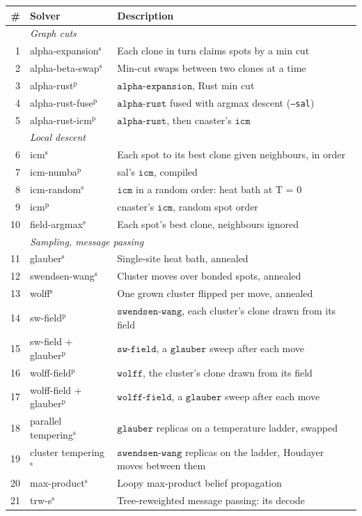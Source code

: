 \begin{tabular}{rll}
\toprule
\# & Solver & Description \\
\midrule
& \multicolumn{2}{l}{\emph{Graph cuts}} \\
1 & alpha-expansion$^{\mathrm{s}}$ & Each clone in turn claims spots by a min cut \\
2 & alpha-beta-swap$^{\mathrm{s}}$ & Min-cut swaps between two clones at a time \\
3 & alpha-rust$^{\mathrm{p}}$ & $\mathtt{alpha{\text{-}}expansion}$, Rust min cut \\
4 & alpha-rust-fuse$^{\mathrm{p}}$ & $\mathtt{alpha{\text{-}}rust}$ fused with argmax descent (\texttt{--sal}) \\
5 & alpha-rust-icm$^{\mathrm{p}}$ & $\mathtt{alpha{\text{-}}rust}$, then cnaster's $\mathtt{icm}$ \\
\addlinespace
& \multicolumn{2}{l}{\emph{Local descent}} \\
6 & icm$^{\mathrm{s}}$ & Each spot to its best clone given neighbours, in order \\
7 & icm-numba$^{\mathrm{p}}$ & sal's $\mathtt{icm}$, compiled \\
8 & icm-random$^{\mathrm{s}}$ & $\mathtt{icm}$ in a random order: heat bath at T = 0 \\
9 & icm$^{\mathrm{p}}$ & cnaster's $\mathtt{icm}$, random spot order \\
10 & field-argmax$^{\mathrm{s}}$ & Each spot's best clone, neighbours ignored \\
\addlinespace
& \multicolumn{2}{l}{\emph{Sampling, message passing}} \\
11 & glauber$^{\mathrm{s}}$ & Single-site heat bath, annealed \\
12 & swendsen-wang$^{\mathrm{s}}$ & Cluster moves over bonded spots, annealed \\
13 & wolff$^{\mathrm{s}}$ & One grown cluster flipped per move, annealed \\
14 & sw-field$^{\mathrm{p}}$ & $\mathtt{swendsen{\text{-}}wang}$, each cluster's clone drawn from its field \\
15 & sw-field + glauber$^{\mathrm{p}}$ & $\mathtt{sw{\text{-}}field}$, a $\mathtt{glauber}$ sweep after each move \\
16 & wolff-field$^{\mathrm{p}}$ & $\mathtt{wolff}$, the cluster's clone drawn from its field \\
17 & wolff-field + glauber$^{\mathrm{p}}$ & $\mathtt{wolff{\text{-}}field}$, a $\mathtt{glauber}$ sweep after each move \\
18 & parallel tempering$^{\mathrm{s}}$ & $\mathtt{glauber}$ replicas on a temperature ladder, swapped \\
19 & cluster tempering$^{\mathrm{s}}$ & $\mathtt{swendsen{\text{-}}wang}$ replicas on the ladder, Houdayer moves between them \\
20 & max-product$^{\mathrm{s}}$ & Loopy max-product belief propagation \\
21 & trw-s$^{\mathrm{s}}$ & Tree-reweighted message passing: its decode \\
\bottomrule
\end{tabular}
